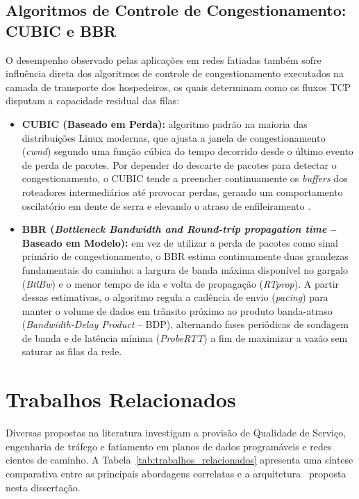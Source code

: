\subsection{Algoritmos de Controle de Congestionamento: CUBIC e BBR}
\label{subsec:controle_congestionamento}

O desempenho observado pelas aplicações em redes fatiadas também sofre influência direta dos algoritmos de controle de congestionamento executados na camada de transporte dos hospedeiros, os quais determinam como os fluxos TCP disputam a capacidade residual das filas:

\begin{itemize}
    \item \textbf{CUBIC (Baseado em Perda):} algoritmo padrão na maioria das distribuições Linux modernas, que ajusta a janela de congestionamento (\textit{cwnd}) segundo uma função cúbica do tempo decorrido desde o último evento de perda de pacotes. Por depender do descarte de pacotes para detectar o congestionamento, o CUBIC tende a preencher continuamente os \textit{buffers} dos roteadores intermediários até provocar perdas, gerando um comportamento oscilatório em dente de serra e elevando o atraso de enfileiramento \cite{Laki2021}.
    \item \textbf{BBR (\textit{Bottleneck Bandwidth and Round-trip propagation time} -- Baseado em Modelo):} em vez de utilizar a perda de pacotes como sinal primário de congestionamento, o BBR estima continuamente duas grandezas fundamentais do caminho: a largura de banda máxima disponível no gargalo (\textit{BtlBw}) e o menor tempo de ida e volta de propagação (\textit{RTprop}). A partir dessas estimativas, o algoritmo regula a cadência de envio (\textit{pacing}) para manter o volume de dados em trânsito próximo ao produto banda-atraso (\textit{Bandwidth-Delay Product} -- BDP), alternando fases periódicas de sondagem de banda e de latência mínima (\textit{ProbeRTT}) a fim de maximizar a vazão sem saturar as filas da rede.
\end{itemize}

\section{Trabalhos Relacionados}
\label{sec:trabalhos_relacionados}

Diversas propostas na literatura investigam a provisão de Qualidade de Serviço, engenharia de tráfego e fatiamento em planos de dados programáveis e redes cientes de caminho. A Tabela~\ref{tab:trabalhos_relacionados} apresenta uma síntese comparativa entre as principais abordagens correlatas e a arquitetura \nome\ proposta nesta dissertação.

